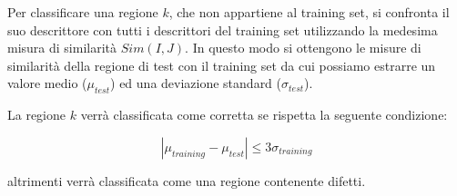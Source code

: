 Per classificare una regione $k$, che non appartiene al training set, si confronta il suo descrittore con tutti i descrittori del training set utilizzando la medesima misura di similarità $Sim(I, J)$. In questo modo si ottengono le misure di similarità della regione di test con il training set da cui possiamo estrarre un valore medio ($\mu_{test}$) ed una deviazione standard ($\sigma_{test}$).

La regione $k$ verrà classificata come corretta se rispetta la seguente condizione:

\begin{equation}
|\mu_{training}- \mu_{test}| \le 3\sigma_{training}
\end{equation}

\noindent altrimenti verrà classificata come una regione contenente difetti.
\pagebreak
